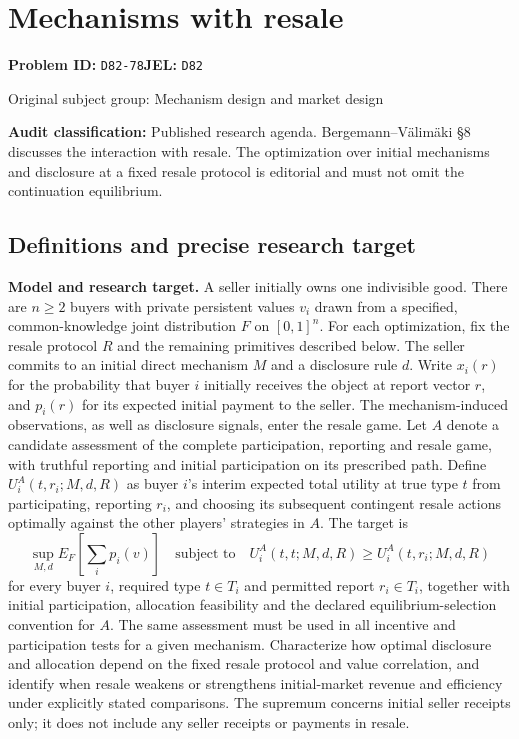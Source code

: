 \documentclass[11pt,a4paper]{article}
\begin{document}
\section*{Mechanisms with resale}
\textbf{Problem ID:} \texttt{D82-78}\quad \textbf{JEL:} \texttt{D82}\par
\label{problem:OP-0292}
{\sffamily\small\color{muted}Original subject group: Mechanism design and market design\par}
\label{definitions:problem:30007574}
\textbf{Audit classification:} Published research agenda. Bergemann–Välimäki §8 discusses the interaction with resale. The optimization over initial mechanisms and disclosure at a fixed resale protocol is editorial and must not omit the continuation equilibrium.
\subsection*{Definitions and precise research target}
\textbf{Model and research target.} A seller initially owns one indivisible good. There are \(n\geq2\) buyers with private persistent values \(v_i\) drawn from a specified, common-knowledge joint distribution \(F\) on \([0,1]^n\). For each optimization, fix the resale protocol \(R\) and the remaining primitives described below. The seller commits to an initial direct mechanism \(M\) and a disclosure rule \(d\). Write \(x_i(r)\) for the probability that buyer \(i\) initially receives the object at report vector \(r\), and \(p_i(r)\) for its expected initial payment to the seller. The mechanism-induced observations, as well as disclosure signals, enter the resale game. Let \(A\) denote a candidate assessment of the complete participation, reporting and resale game, with truthful reporting and initial participation on its prescribed path. Define \(U_i^A(t,r_i;M,d,R)\) as buyer \(i\)'s interim expected total utility at true type \(t\) from participating, reporting \(r_i\), and choosing its subsequent contingent resale actions optimally against the other players' strategies in \(A\). The target is
\[
 \sup_{M,d}E_F\left[\sum_i p_i(v)\right]
 \quad\text{subject to}\quad
 U_i^A(t,t;M,d,R)\geq U_i^A(t,r_i;M,d,R)
\]
for every buyer \(i\), required type \(t\in T_i\) and permitted report \(r_i\in T_i\), together with initial participation, allocation feasibility and the declared equilibrium-selection convention for \(A\). The same assessment must be used in all incentive and participation tests for a given mechanism. Characterize how optimal disclosure and allocation depend on the fixed resale protocol and value correlation, and identify when resale weakens or strengthens initial-market revenue and efficiency under explicitly stated comparisons. The supremum concerns initial seller receipts only; it does not include any seller receipts or payments in resale.
\end{document}
